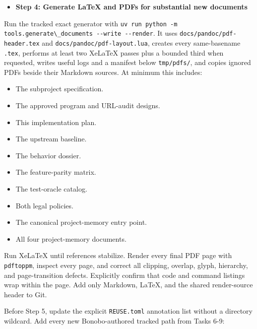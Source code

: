 \documentclass[
  letterpaper,
]{article}
\newcommand{\passthrough}[1]{#1}
\providecommand{\tightlist}{%
  \setlength{\itemsep}{0pt}\setlength{\parskip}{0pt}}
\begin{document}
\begin{itemize}
\tightlist
\item[$\boxtimes$]
  \textbf{Step 4: Generate LaTeX and PDFs for substantial new documents}
\end{itemize}

Run the tracked exact generator with
\passthrough{\lstinline!uv run python -m tools.generate\_documents --write --render!}. It uses
\nolinkurl{docs/pandoc/pdf-header.tex} and \nolinkurl{docs/pandoc/pdf-layout.lua}, creates every same-basename
\passthrough{\lstinline!.tex!}, performs at least two XeLaTeX passes plus a bounded third when requested, writes useful
logs and a manifest below \passthrough{\lstinline!tmp/pdfs/!}, and copies ignored PDFs beside their Markdown sources. At
minimum this includes:

\begin{itemize}
\tightlist
\item
  The subproject specification.
\item
  The approved program and URL-audit designs.
\item
  This implementation plan.
\item
  The upstream baseline.
\item
  The behavior dossier.
\item
  The feature-parity matrix.
\item
  The test-oracle catalog.
\item
  Both legal policies.
\item
  The canonical project-memory entry point.
\item
  All four project-memory documents.
\end{itemize}

Run XeLaTeX until references stabilize. Render every final PDF page with \passthrough{\lstinline!pdftoppm!}, inspect
every page, and correct all clipping, overlap, glyph, hierarchy, and page-transition defects. Explicitly confirm that
code and command listings wrap within the page. Add only Markdown, LaTeX, and the shared render-source header to Git.

Before Step 5, update the explicit \nolinkurl{REUSE.toml} annotation list without a directory wildcard. Add every new
Bonobo-authored tracked path from Tasks 6-9:
\end{document}
